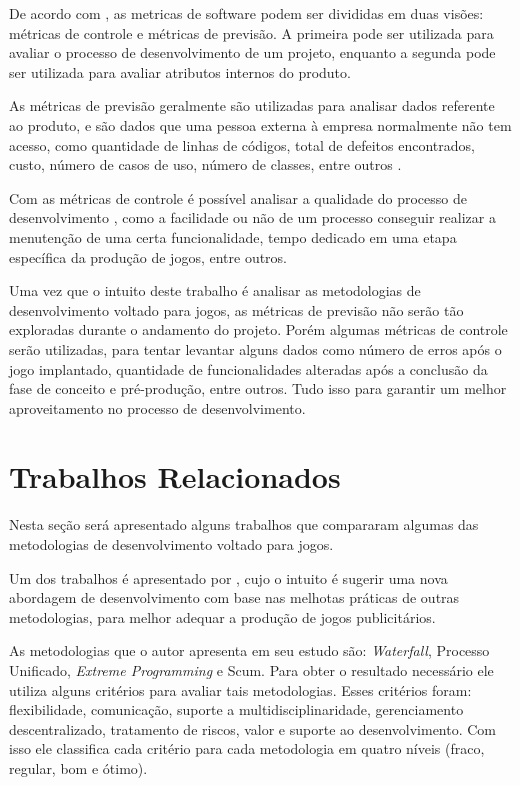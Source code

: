 \documentclass[quali]{ppgccufscar}
\begin{document}
De acordo com , as metricas de software podem ser divididas em duas visões: métricas de controle e métricas de previsão. A primeira pode ser utilizada para avaliar o processo de desenvolvimento de um projeto, enquanto a segunda pode ser utilizada para avaliar atributos internos do produto.

As métricas de previsão geralmente são utilizadas para analisar dados referente ao produto, e são dados que uma pessoa externa à empresa normalmente não tem acesso, como quantidade de linhas de códigos, total de defeitos encontrados, custo, número de casos de uso, número de classes, entre outros \cite{guarizzo2008}. 

Com as métricas de controle é possível analisar a qualidade do processo de desenvolvimento \cite{pressman2005}, como a facilidade ou não de um processo conseguir realizar a menutenção de uma certa funcionalidade, tempo dedicado em uma etapa específica da produção de jogos, entre outros.

Uma vez que o intuito deste trabalho é analisar as metodologias de desenvolvimento voltado para jogos, as métricas de previsão não serão tão exploradas durante o andamento do projeto. Porém algumas métricas de controle serão utilizadas, para tentar levantar alguns dados como número de erros após o jogo implantado, quantidade de funcionalidades alteradas após a conclusão da fase de conceito e pré-produção, entre outros. Tudo isso para garantir um melhor aproveitamento no processo de desenvolvimento.



\section{Trabalhos Relacionados}

Nesta seção será apresentado alguns trabalhos que compararam algumas das metodologias de desenvolvimento voltado para jogos.

Um dos trabalhos é apresentado por , cujo o intuito é sugerir uma nova abordagem de desenvolvimento com base nas melhotas práticas de outras metodologias, para melhor adequar a produção de jogos publicitários. 

As metodologias que o autor apresenta em seu estudo são: \textit{Waterfall}, Processo Unificado, \textit{Extreme Programming} e Scum. Para obter o resultado necessário ele utiliza alguns critérios para avaliar tais metodologias. Esses critérios foram: flexibilidade, comunicação, suporte a multidisciplinaridade, gerenciamento descentralizado, tratamento de riscos, valor e suporte ao desenvolvimento. Com isso ele classifica cada critério para cada metodologia em quatro níveis (fraco, regular, bom e ótimo).
\end{document}
